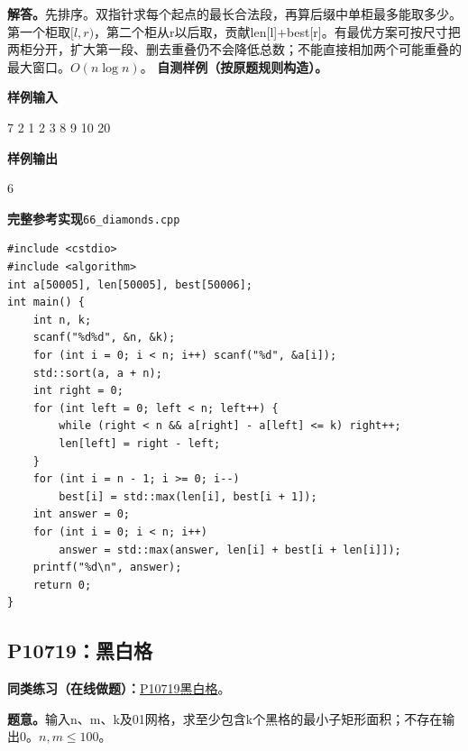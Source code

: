 \documentclass[UTF8,11pt,a4paper,fontset=none]{ctexart}
\newcommand{\practice}[2]{\par\noindent\textbf{同类练习（在线做题）：}\href{https://www.luogu.com.cn/problem/#1}{#1\quad #2}。\par}
\begin{document}
\noindent\textbf{解答。}先排序。双指针求每个起点的最长合法段，再算后缀中单柜最多能取多少。第一个柜取$[l,r)$，第二个柜从r以后取，贡献len[l]+best[r]。有最优方案可按尺寸把两柜分开，扩大第一段、删去重叠仍不会降低总数；不能直接相加两个可能重叠的最大窗口。$O(n\log n)$。
\textbf{自测样例（按原题规则构造）。}
\begin{tcolorbox}[samplebox,title={输入输出样例}]
\textbf{样例输入}
\begin{Sample}
7 2
1 2 3 8 9 10 20
\end{Sample}
\tcblower
\textbf{样例输出}
\begin{Sample}
6
\end{Sample}
\end{tcolorbox}
\par\noindent\begin{minipage}{\linewidth}
\textbf{完整参考实现}\quad\texttt{66\_diamonds.cpp}
\begin{lstlisting}
#include <cstdio>
#include <algorithm>
int a[50005], len[50005], best[50006];
int main() {
    int n, k;
    scanf("%d%d", &n, &k);
    for (int i = 0; i < n; i++) scanf("%d", &a[i]);
    std::sort(a, a + n);
    int right = 0;
    for (int left = 0; left < n; left++) {
        while (right < n && a[right] - a[left] <= k) right++;
        len[left] = right - left;
    }
    for (int i = n - 1; i >= 0; i--)
        best[i] = std::max(len[i], best[i + 1]);
    int answer = 0;
    for (int i = 0; i < n; i++)
        answer = std::max(answer, len[i] + best[i + len[i]]);
    printf("%d\n", answer);
    return 0;
}
\end{lstlisting}
\end{minipage}\par


\subsection{P10719：黑白格}

\practice{P10719}{[GESP202406 五级] 黑白格}

\noindent\textbf{题意。}输入n、m、k及01网格，求至少包含k个黑格的最小子矩形面积；不存在输出0。$n,m\le100$。
\end{document}
